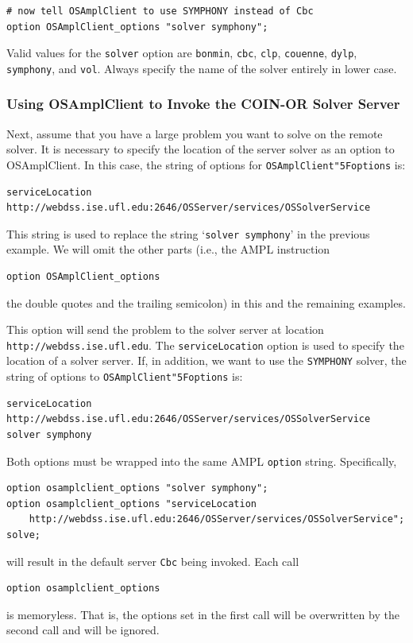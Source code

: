 \documentclass[11pt]{article}
\renewcommand{\_}{{\char"5F}}
\renewcommand{\{}{{\char"7B}}
\renewcommand{\}}{{\char"7D}}
\renewcommand{\^}{{\char"0D}}
\renewcommand{\'}{{\char"0D}}
\begin{document}
\begin{enumerate}[Step 1:]
\begin{verbatim}
# now tell OSAmplClient to use SYMPHONY instead of Cbc
option OSAmplClient_options "solver symphony";
\end{verbatim}

Valid values for the {\tt solver} option are {\tt bonmin}, {\tt cbc}, {\tt clp}, {\tt couenne}, 
{\tt dylp}, {\tt symphony}, and {\tt vol}. Always specify the name of the solver entirely in lower case.  


\subsubsection{Using OSAmplClient to Invoke the COIN-OR Solver Server}\label{section:remoteampl}

Next, assume that you have a large problem you want to solve on the remote solver. It is necessary 
to specify the location of the server solver as an option to OSAmplClient. In this case, 
the string of options for {\tt OSAmplClient\_options} is:

\begin{verbatim}
serviceLocation  http://webdss.ise.ufl.edu:2646/OSServer/services/OSSolverService
\end{verbatim}

This string is used to replace the string `{\tt solver symphony}' in the previous example. 
We will omit the other parts (i.e., the AMPL instruction
\begin{verbatim}
option OSAmplClient_options
\end{verbatim}
the double quotes and the trailing semicolon) in this and the remaining examples.
 
This option will send the problem to the solver server at location {\tt http://webdss.ise.ufl.edu}.   
The {\tt serviceLocation} option is used to specify the location of a solver server. If, in addition, 
we want to use the {\tt SYMPHONY} solver,  the string of options to {\tt OSAmplClient\_options} is:
\begin{verbatim}
serviceLocation  http://webdss.ise.ufl.edu:2646/OSServer/services/OSSolverService
solver symphony
\end{verbatim}

Both options must be wrapped into the same AMPL {\tt option} string. Specifically,
\begin{verbatim}
option osamplclient_options "solver symphony";
option osamplclient_options "serviceLocation  
    http://webdss.ise.ufl.edu:2646/OSServer/services/OSSolverService";
solve;
\end{verbatim}
will result in the default server {\tt Cbc} being invoked.  Each call 
\begin{verbatim}
option osamplclient_options
\end{verbatim}
is memoryless. That is, the options set in the first call will be overwritten by the second call and
will be ignored.


\end{enumerate}
\end{document}
